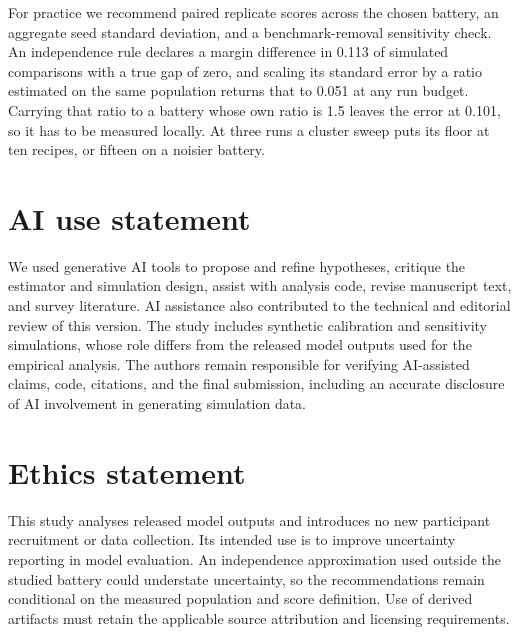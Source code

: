 \documentclass{article}
\begin{document}
For practice we recommend paired replicate scores across the chosen battery, an aggregate seed standard deviation, and a benchmark-removal sensitivity check. An independence rule declares a margin difference in 0.113 of simulated comparisons with a true gap of zero, and scaling its standard error by a ratio estimated on the same population returns that to 0.051 at any run budget. Carrying that ratio to a battery whose own ratio is 1.5 leaves the error at 0.101, so it has to be measured locally. At three runs a cluster sweep puts its floor at ten recipes, or fifteen on a noisier battery.

\label{maintext:end}
\section*{AI use statement}
We used generative AI tools to propose and refine hypotheses, critique the estimator and simulation design, assist with analysis code, revise manuscript text, and survey literature. AI assistance also contributed to the technical and editorial review of this version. The study includes synthetic calibration and sensitivity simulations, whose role differs from the released model outputs used for the empirical analysis. The authors remain responsible for verifying AI-assisted claims, code, citations, and the final submission, including an accurate disclosure of AI involvement in generating simulation data.

\section*{Ethics statement}
This study analyses released model outputs and introduces no new participant recruitment or data collection. Its intended use is to improve uncertainty reporting in model evaluation. An independence approximation used outside the studied battery could understate uncertainty, so the recommendations remain conditional on the measured population and score definition. Use of derived artifacts must retain the applicable source attribution and licensing requirements.
\end{document}
